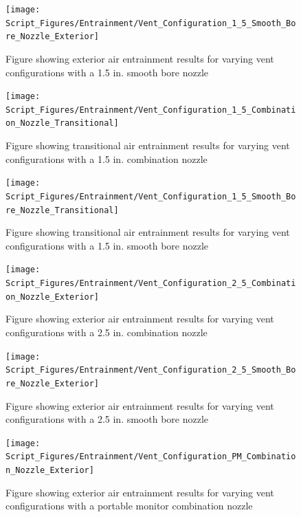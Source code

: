 \documentclass{article}
\begin{document}
\clearpage

\begin{figure}[!ht]
\centering
\texttt{[image: Script\_Figures/Entrainment/Vent\_Configuration\_1\_5\_Smooth\_Bore\_Nozzle\_Exterior]}
\caption{Figure showing exterior air entrainment results for varying vent configurations with a 1.5 in. smooth bore nozzle}
\label{fig:1_5_Exterior_Smooth_Bore_Vent_Config}
\end{figure}

\clearpage

\begin{figure}[!ht]
\centering
\texttt{[image: Script\_Figures/Entrainment/Vent\_Configuration\_1\_5\_Combination\_Nozzle\_Transitional]}
\caption{Figure showing transitional air entrainment results for varying vent configurations with a 1.5 in. combination nozzle}
\label{fig:1_5_Transitional_Combination_Vent_Config}
\end{figure}

\clearpage

\begin{figure}[!ht]
\centering
\texttt{[image: Script\_Figures/Entrainment/Vent\_Configuration\_1\_5\_Smooth\_Bore\_Nozzle\_Transitional]}
\caption{Figure showing transitional air entrainment results for varying vent configurations with a 1.5 in. smooth bore nozzle}
\label{fig:1_5_Transitional_Smooth_Bore_Vent_Config}
\end{figure}

\clearpage

\begin{figure}[!ht]
\centering
\texttt{[image: Script\_Figures/Entrainment/Vent\_Configuration\_2\_5\_Combination\_Nozzle\_Exterior]}
\caption{Figure showing exterior air entrainment results for varying vent configurations with a 2.5 in. combination nozzle}
\label{fig:2_5_Exterior_Combination_Vent_Config}
\end{figure}

\clearpage

\begin{figure}[!ht]
\centering
\texttt{[image: Script\_Figures/Entrainment/Vent\_Configuration\_2\_5\_Smooth\_Bore\_Nozzle\_Exterior]}
\caption{Figure showing exterior air entrainment results for varying vent configurations with a 2.5 in. smooth bore nozzle}
\label{fig:2_5_Exterior_Smooth_Bore_Vent_Config}
\end{figure}

\clearpage

\begin{figure}[!ht]
\centering
\texttt{[image: Script\_Figures/Entrainment/Vent\_Configuration\_PM\_Combination\_Nozzle\_Exterior]}
\caption{Figure showing exterior air entrainment results for varying vent configurations with a portable monitor combination nozzle}
\label{fig:PM_Exterior_Combination_Vent_Config}
\end{figure}
\end{document}

